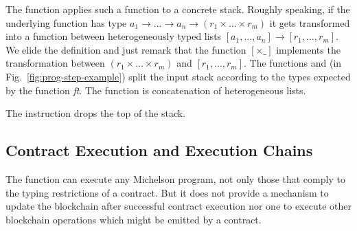 The function  applies such a function to a concrete
stack. Roughly speaking, if the underlying function has type $a_1 \to \dots \to a_n \to
(r_1 \times \dots \times r_m)$ it gets transformed into a function
between heterogeneously typed lists
$[a_1, \dots, a_n] \to [r_1, \dots, r_m]$. We elide the definition and
just remark that the function $[{\times}\_]$ implements the
transformation between $(r_1 \times \dots \times r_m)$ and $[r_1,
\dots, r_m]$. The functions  and  (in Fig.~\ref{fig:prog-step-example}) split the
input stack according to the types expected by the function \textit{ft}. The
function  is concatenation of heterogeneous lists.

The  instruction drops the top of the stack.



\subsection{Contract Execution and Execution Chains}\label{sec:contract-execution}

The  function can execute any Michelson program, not only those that comply
to the typing restrictions of a contract.
But it does not provide a mechanism to update the blockchain after successful contract execution
nor one to execute other blockchain operations which might be emitted by a contract.

\begin{comment}
When a contract execution terminates, the final stack interpretation will contain a pair
of a list of blockchain operations to be emitted by the contract as well as the updated
storage value of the contract.
Also contract execution is triggered by transfering some amount of Tezos tokens to it,
so it's balance and storage has to be updated and the emitted operations
must be staged for execution.
\end{comment}


